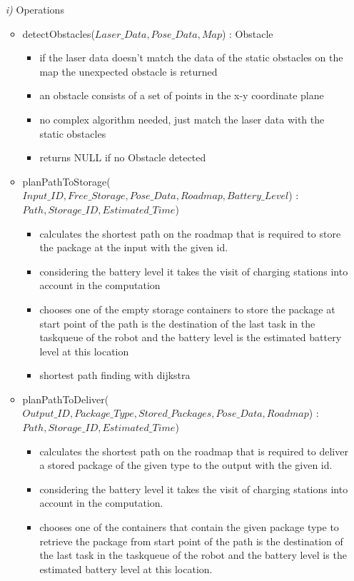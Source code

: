 \documentclass{article}
\begin{document}
\begin{enumerate}
	\item[\textit{i)}] Operations
	\begin{itemize}
		\item detectObstacles($Laser\_Data, Pose\_Data, Map$) : Obstacle
		\begin{itemize}
			\item if the laser data doesn't match the data of the static obstacles on the map the unexpected obstacle is returned
			\item an obstacle consists of a set of points in the x-y coordinate plane
			\item no complex algorithm needed, just match the laser data with the static obstacles
			\item returns NULL if no Obstacle detected
		\end{itemize}
		\item planPathToStorage($Input\_ID, Free\_Storage, Pose\_Data, Roadmap, Battery\_Level$) : $Path, Storage\_ID, Estimated\_Time$)
		\begin{itemize}
			\item calculates the shortest path on the roadmap that is required to store the package at the input with the given id.
			\item considering the battery level it takes the visit of charging stations into account in the computation
			\item chooses one of the empty storage containers to store the package at start point of the path is the destination of the last task in the taskqueue of the robot and the battery level is the estimated battery level at this location 
			\item shortest path finding with dijkstra
		\end{itemize}
		\item planPathToDeliver($Output\_ID, Package\_Type, Stored\_Packages, Pose\_Data, Roadmap$) : $Path, Storage\_ID, Estimated\_Time$)
		\begin{itemize}
			\item calculates the shortest path on the roadmap that is required to deliver a stored package of the given type to the output with the given id.
			\item considering the battery level it takes the visit of charging stations into account in the computation.
			\item chooses one of the containers that contain the given package type to retrieve the package from start point of the path is the destination of the last task in the taskqueue of the robot and the battery level is the estimated battery level at this location.

\end{itemize}
\end{itemize}
\end{enumerate}
\end{document}
